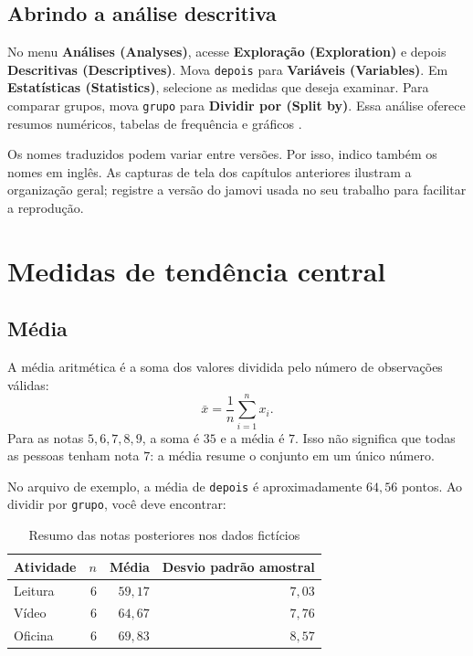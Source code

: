 \subsection{Abrindo a análise descritiva}

No menu \textbf{Análises (Analyses)}, acesse \textbf{Exploração (Exploration)} e depois \textbf{Descritivas (Descriptives)}. Mova \texttt{depois} para \textbf{Variáveis (Variables)}. Em \textbf{Estatísticas (Statistics)}, selecione as medidas que deseja examinar. Para comparar grupos, mova \texttt{grupo} para \textbf{Dividir por (Split by)}. Essa análise oferece resumos numéricos, tabelas de frequência e gráficos \parencite{JamoviDescritivas}.

Os nomes traduzidos podem variar entre versões. Por isso, indico também os nomes em inglês. As capturas de tela dos capítulos anteriores ilustram a organização geral; registre a versão do jamovi usada no seu trabalho para facilitar a reprodução.

\section{Medidas de tendência central}

\subsection{Média}

A média aritmética é a soma dos valores dividida pelo número de observações válidas:
\[
\bar{x}=\frac{1}{n}\sum_{i=1}^{n}x_i.
\]
Para as notas $5,6,7,8,9$, a soma é $35$ e a média é $7$. Isso não significa que todas as pessoas tenham nota $7$: a média resume o conjunto em um único número.

No arquivo de exemplo, a média de \texttt{depois} é aproximadamente $64{,}56$ pontos. Ao dividir por \texttt{grupo}, você deve encontrar:

\begin{table}[H]
\centering
\caption{Resumo das notas posteriores nos dados fictícios}
\begin{tabular}{lrrr}
\hline
Atividade & $n$ & Média & Desvio padrão amostral \\
\hline
Leitura & 6 & $59{,}17$ & $7{,}03$ \\
Vídeo & 6 & $64{,}67$ & $7{,}76$ \\
Oficina & 6 & $69{,}83$ & $8{,}57$ \\
\hline
\end{tabular}
\label{tab:descritivas-notas}
\end{table}

